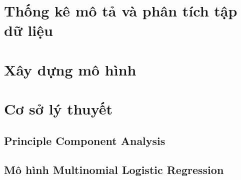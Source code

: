 \documentclass[14pt, a4paper]{article}
\theoremstyle{sltheorem}
\theoremstyle{soltheorem}
\begin{document}
            

            




    \section{Thống kê mô tả và phân tích tập dữ liệu}
    
    

    

    

    \section{Xây dựng mô hình}

    

    
    
    

    \section{Cơ sở lý thuyết}

    \subsection{Principle Component Analysis}

    

    \subsection{Mô hình Multinomial Logistic Regression}
\end{document}
